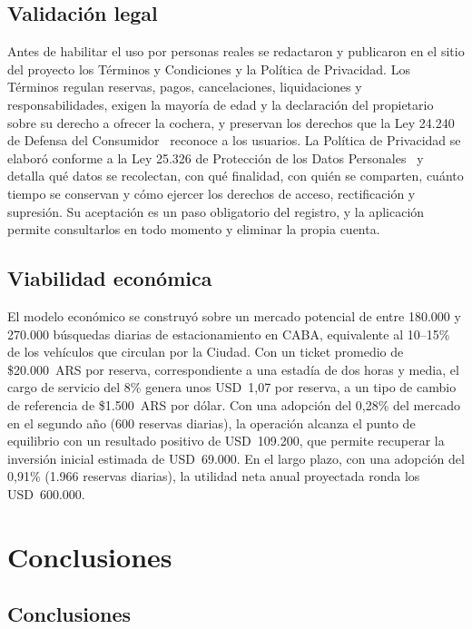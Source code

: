 \documentclass[conference,a4paper]{IEEEtran}
\begin{document}
\subsection{Validación legal}

Antes de habilitar el uso por personas reales se redactaron y publicaron en el sitio del proyecto los Términos y Condiciones y la Política de Privacidad. Los Términos regulan reservas, pagos, cancelaciones, liquidaciones y responsabilidades, exigen la mayoría de edad y la declaración del propietario sobre su derecho a ofrecer la cochera, y preservan los derechos que la Ley 24.240 de Defensa del Consumidor~\cite{ley24240} reconoce a los usuarios. La Política de Privacidad se elaboró conforme a la Ley 25.326 de Protección de los Datos Personales~\cite{ley25326} y detalla qué datos se recolectan, con qué finalidad, con quién se comparten, cuánto tiempo se conservan y cómo ejercer los derechos de acceso, rectificación y supresión. Su aceptación es un paso obligatorio del registro, y la aplicación permite consultarlos en todo momento y eliminar la propia cuenta.

\subsection{Viabilidad económica}

El modelo económico se construyó sobre un mercado potencial de entre 180.000 y 270.000 búsquedas diarias de estacionamiento en CABA, equivalente al 10--15\% de los vehículos que circulan por la Ciudad. Con un ticket promedio de \$20.000~ARS por reserva, correspondiente a una estadía de dos horas y media, el cargo de servicio del 8\% genera unos USD~1,07 por reserva, a un tipo de cambio de referencia de \$1.500~ARS por dólar. Con una adopción del 0,28\% del mercado en el segundo año (600 reservas diarias), la operación alcanza el punto de equilibrio con un resultado positivo de USD~109.200, que permite recuperar la inversión inicial estimada de USD~69.000. En el largo plazo, con una adopción del 0,91\% (1.966 reservas diarias), la utilidad neta anual proyectada ronda los USD~600.000.

\section{Conclusiones}\label{sec:conclusiones}

\subsection{Conclusiones}
\end{document}
